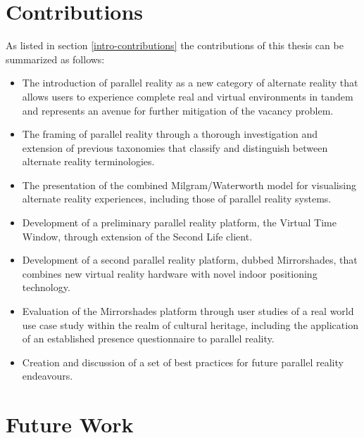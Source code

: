 
\section{Contributions}

As listed in section \ref{intro-contributions} the contributions of this thesis can be summarized as follows:

\begin{itemize}
	\item The introduction of parallel reality as a new category of alternate reality that allows users to experience complete real and virtual environments in tandem and represents an avenue for further mitigation of the vacancy problem.
	\item The framing of parallel reality through a thorough investigation and extension of previous taxonomies that classify and distinguish between alternate reality terminologies.
	\item The presentation of the combined Milgram/Waterworth model for visualising alternate reality experiences, including those of parallel reality systems.
	\item Development of a preliminary parallel reality platform, the Virtual Time Window, through extension of the Second Life client.
	\item Development of a second parallel reality platform, dubbed Mirrorshades, that combines new virtual reality hardware with novel indoor positioning technology.
	\item Evaluation of the Mirrorshades platform through user studies of a real world use case study within the realm of cultural heritage, including the application of an established presence questionnaire to parallel reality.
	\item Creation and discussion of a set of best practices for future parallel reality endeavours.
\end{itemize}


\section{Future Work}

